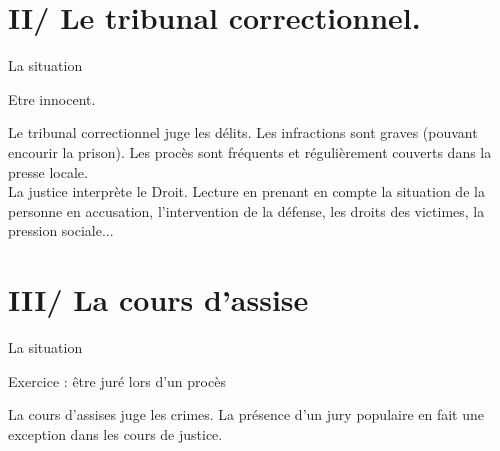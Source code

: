 \documentclass{beamer}
\begin{document}




\section{II/ Le tribunal correctionnel.}
\begin{frame}{La situation}

\end{frame}

\begin{frame}{Etre innocent.}

\end{frame}

\begin{frame}
Le tribunal correctionnel juge les délits. Les infractions sont graves (pouvant encourir la prison). Les procès sont fréquents et régulièrement couverts dans la presse locale. \\
La justice interprète le Droit. Lecture en prenant en compte la situation de la personne en accusation, l'intervention de la défense, les droits des victimes, la pression sociale...
\end{frame}

\section{III/ La cours d'assise}

\begin{frame}{La situation}

\end{frame}

\begin{frame}{Exercice : être juré lors d'un procès}

\end{frame}

\begin{frame}
La cours d'assises juge les crimes. La présence d'un jury populaire en fait une exception dans les cours de justice.
\end{frame}
\end{document}
